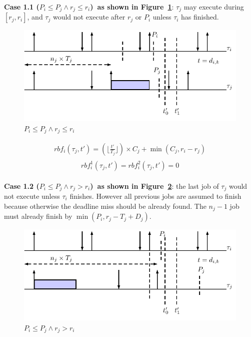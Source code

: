 \documentclass[12pt,conference,onecolumn]{IEEEtran}
\begin{document}
\textbf{Case 1.1 ($P_i\leq P_j\wedge r_j\leq r_i$)~as shown in  Figure~\ref{fig:case3}}: $\tau_j$ may execute during $[r_j,r_i]$, and $\tau_j$ would not execute after $r_j$ or $P_i$ unless $\tau_i$ has finished.


	\begin{figure}[h!]
 \centering
\includegraphics[scale=1]{Figure/C3}  
\caption{$P_i\leq P_j\wedge r_j\leq r_i$}
  \label{fig:case3}
\end{figure}
		\begin{align*}
		rbf_i(\tau_j,t')=(\lfloor \frac{t'}{T_j} \rfloor)\times C_j+\min(C_j,r_i-r_j)
	\end{align*}
\begin{align*}
\begin{split}
rbf_{i}^1(\tau_j,t')=rbf_{i}^2(\tau_j,t')=0
\end{split}
\end{align*}


\textbf{Case 1.2 ($P_i\leq P_j\wedge r_j> r_i$)~as shown in  Figure~\ref{fig:case4}}:  the last job of $\tau_j$ would not execute unless $\tau_i$ finishes. However all previous jobs are assumed to finish because otherwise the deadline miss should be already found. The $n_j-1$ job must already finish by $\min(P_i,r_j-T_j+D_j)$.

	\begin{figure}[h!]
 \centering
\includegraphics[scale=1]{Figure/C31}  
\caption{$P_i\leq P_j\wedge r_j> r_i$}
  \label{fig:case4}
\end{figure}
\end{document}
